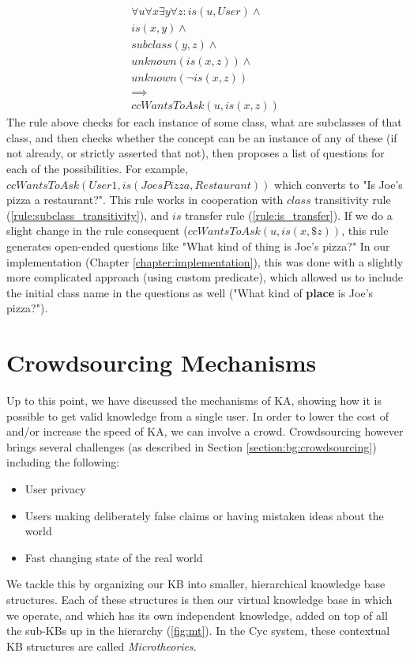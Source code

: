 \begin{equation}\label{rule:autoIs}
\begin{gathered}
 \forall u \forall x \exists y \forall z:
 is (u,User) \land \\
 is(x,y) \land \\
 subclass(y,z) \land \\
 unknown (is(x,z)) \land \\
 unknown(\lnot is(x,z)) \\
 \implies\\
 ccWantsToAsk(u,is(x,z))
\end{gathered}
\end{equation}
The rule above checks for each instance of some class, what are subclasses of 
that class, and then checks whether the concept can be an instance of any of 
these (if not already, or strictly asserted that not), then proposes a list of questions for each of the possibilities. For example,
$ccWantsToAsk(User1,is(JoesPizza,Restaurant))$ which converts to "Is Joe's 
pizza a restaurant?". This rule works in cooperation with $class$ transitivity
rule (\ref{rule:subclass_transitivity}), and $is$ transfer rule 
(\ref{rule:is_transfer}).
If we do a slight change in the rule consequent ($ccWantsToAsk(u,is(x,\$z))$,
this rule generates open-ended questions like "What kind of thing is Joe's
pizza?" In our implementation (Chapter \ref{chapter:implementation}), this was
done with a slightly more complicated approach (using custom predicate), which
allowed us to include the initial class name in the questions as well 
("What kind of \textbf{place} is Joe's pizza?"). 

\section{Crowdsourcing Mechanisms}
\label{section:crowdsourcing}
Up to this point, we have discussed the mechanisms of KA, showing how it is 
possible to get valid knowledge from a single user. In order to lower the cost 
of and/or increase the speed of KA, we can involve a crowd. Crowdsourcing 
however brings several challenges (as described in Section 
\ref{section:bg:crowdsourcing}) including the following:
\begin{itemize}
\item User privacy
\item Users making deliberately false claims or having mistaken ideas about the 
world
\item Fast changing state of the real world
\end{itemize}
We tackle this by organizing our KB into smaller, hierarchical knowledge base 
structures. Each of these structures is then our virtual knowledge base in 
which we operate, and which has its own independent knowledge, added on top of 
all the sub-KBs up in the hierarchy (\autoref{fig:mt}). In the Cyc system, these
contextual KB structures are called \emph{Microtheories}\parencite{Kleer2013}.

